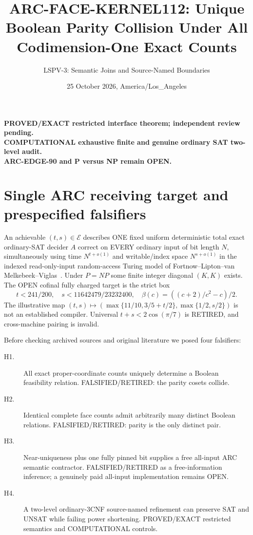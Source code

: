 \documentclass[11pt]{article}
\title{ARC-FACE-KERNEL112: Unique Boolean Parity Collision Under All Codimension-One Exact Counts}
\author{LSPV-3: Semantic Joins and Source-Named Boundaries}
\date{25 October 2026, America/Los\_Angeles}
\begin{document}
\maketitle
\begin{center}\textbf{PROVED/EXACT restricted interface theorem; independent review pending.}\\
\textbf{COMPUTATIONAL exhaustive finite and genuine ordinary SAT two-level audit.}\\
\textbf{ARC-EDGE-90 and P versus NP remain OPEN.}\end{center}
\section{Single ARC receiving target and prespecified falsifiers}
An achievable $(t,s)\in\mathcal E$ describes ONE fixed uniform deterministic total exact ordinary-SAT decider $A$ correct on EVERY ordinary input of bit length $N$, simultaneously using time $N^{t+o(1)}$ and writable/index space $N^{s+o(1)}$ in the indexed read-only-input random-access Turing model of Fortnow--Lipton--van Melkebeek--Viglas~\cite{flmv}. Under $P=NP$ some finite integer diagonal $(K,K)$ exists. The OPEN cofinal fully charged target is the strict box
\[
t<241/200,\quad s<11642479/23232400,\quad \beta(c)=((c+2)/c^2-c)/2.
\]
The illustrative map $(t,s)\mapsto(\max\{11/10,3/5+t/2\},\max\{1/2,s/2\})$ is not an established compiler. Universal $t+s<2\cos(\pi/7)$ is RETIRED, and cross-machine pairing is invalid.

Before checking archived sources and original literature we posed four falsifiers:
\begin{description}
\item[H1.] All exact proper-coordinate counts uniquely determine a Boolean feasibility relation. FALSIFIED/RETIRED: the parity cosets collide.
\item[H2.] Identical complete face counts admit arbitrarily many distinct Boolean relations. FALSIFIED/RETIRED: parity is the only distinct pair.
\item[H3.] Near-uniqueness plus one fully pinned bit supplies a free all-input ARC semantic contractor. FALSIFIED/RETIRED as a free-information inference; a genuinely paid all-input implementation remains OPEN.
\item[H4.] A two-level ordinary-3CNF source-named refinement can preserve SAT and UNSAT while failing power shortening. PROVED/EXACT restricted semantics and COMPUTATIONAL controls.
\end{description}
\end{document}
